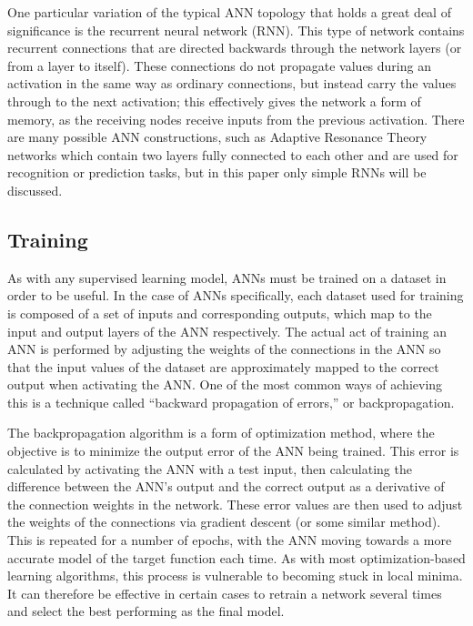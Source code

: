 \documentclass[ author={Stephen Livermore-Tozer},
				supervisor={Dr. Peter Flach},
				degree={MEng},
				title={Algorithmic Co-composition Using Machine Learning},
				subtitle={},
				type={research},
				year={2016} ]{dissertation}
\begin{document}
	One particular variation of the typical ANN topology that holds a great deal of significance is the recurrent neural network (RNN). This type of network contains recurrent connections that are directed backwards through the network layers (or from a layer to itself). These connections do not propagate values during an activation in the same way as ordinary connections, but instead carry the values through to the next activation; this effectively gives the network a form of memory, as the receiving nodes receive inputs from the previous activation. There are many possible ANN constructions, such as Adaptive Resonance Theory networks which contain two layers fully connected to each other and are used for recognition or prediction tasks, but in this paper only simple RNNs will be discussed.
	
	\subsection{Training}
	
	As with any supervised learning model, ANNs must be trained on a dataset in order to be useful. In the case of ANNs specifically, each dataset used for training is composed of a set of inputs and corresponding outputs, which map to the input and output layers of the ANN respectively. The actual act of training an ANN is performed by adjusting the weights of the connections in the ANN so that the input values of the dataset are approximately mapped to the correct output when activating the ANN. One of the most common ways of achieving this is a technique called ``backward propagation of errors,'' or backpropagation.
	
	The backpropagation algorithm is a form of optimization method, where the objective is to minimize the output error of the ANN being trained. This error is calculated by activating the ANN with a test input, then calculating the difference between the ANN's output and the correct output as a derivative of the connection weights in the network. These error values are then used to adjust the weights of the connections via gradient descent (or some similar method). This is repeated for a number of epochs, with the ANN moving towards a more accurate model of the target function each time. As with most optimization-based learning algorithms, this process is vulnerable to becoming stuck in local minima. It can therefore be effective in certain cases to retrain a network several times and select the best performing as the final model.
	
\end{document}
